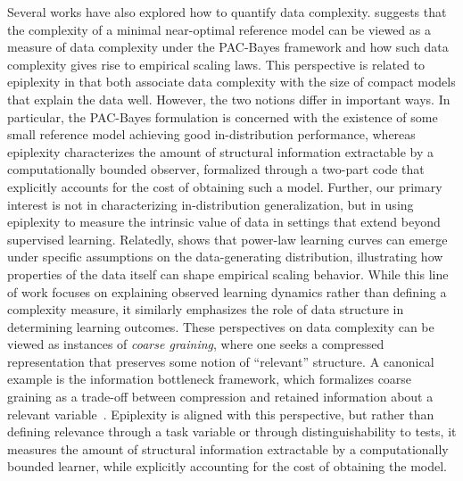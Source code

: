 \documentclass[twoside]{article}
\begin{document}
Several works have also explored how to quantify data complexity. \citet{dziugaite2025size} suggests that the complexity of a minimal near-optimal reference model can be viewed as a measure of data complexity under the PAC-Bayes framework and how such data complexity gives rise to empirical scaling laws.
This perspective is related to epiplexity in that both associate data complexity with the size of compact models that explain the data well. 
However, the two notions differ in important ways. 
In particular, the PAC-Bayes formulation is concerned with the existence of some small reference model achieving good in-distribution performance, whereas epiplexity characterizes the amount of structural information extractable by a computationally bounded observer, formalized through a two-part code that explicitly accounts for the cost of obtaining such a model. 
Further, our primary interest is not in characterizing in-distribution generalization, but in using epiplexity to measure the intrinsic value of data in settings that extend beyond supervised learning.
%
%
%
%
Relatedly, \citet{hutter2021learning} shows that power-law learning curves can emerge under specific assumptions on the data-generating distribution, illustrating how properties of the data itself can shape empirical scaling behavior. While this line of work focuses on explaining observed learning dynamics rather than defining a complexity measure, it similarly emphasizes the role of data structure in determining learning outcomes. 
%
These perspectives on data complexity can be viewed as instances of \emph{coarse graining}, where one seeks a compressed representation that preserves some notion of ``relevant'' structure. A canonical example is the information bottleneck framework, which formalizes coarse graining as a trade-off between compression and retained information about a relevant variable~\citep{tishby2000information}. 
Epiplexity is aligned with this perspective, but rather than defining relevance through a task variable or through distinguishability to tests, it measures the amount of structural information extractable by a computationally bounded learner, while explicitly accounting for the cost of obtaining the model.
\end{document}
